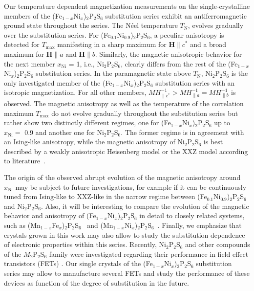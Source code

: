 \documentclass[twocolumn,superscriptaddress,prb,preprintnumbers,nobibnotes,aps]{revtex4-2}  %
\begin{document}
Our temperature dependent magnetization measurements on the single-crystalline members of the (Fe$_{1-x}$Ni$_x$)$_2$P$_2$S$_6$ substitution series exhibit an antiferromagnetic ground state throughout the series. The N\'{e}el temperature $T_\textrm{N}$, evolves gradually over the substitution series.  For (Fe$_{0.1}$Ni$_{0.9}$)$_2$P$_2$S$_6$, a peculiar anisotropy is detected for $T_\textrm{max}$ manifesting in a sharp maximum for $\boldsymbol{H} \parallel c^*$ and a broad maximum for $\boldsymbol{H} \parallel a$ and $\boldsymbol{H} \parallel b$. Similarly, the magnetic anisotropic behavior for the next member $x_\textrm{Ni}$ = 1, i.e., Ni$_2$P$_2$S$_6$, clearly differs from the rest of the (Fe$_{1-x}$Ni$_x$)$_2$P$_2$S$_6$ substitution series. In the paramagnetic state above $T_\textrm{N}$, Ni$_2$P$_2$S$_6$ is the only investigated member of the (Fe$_{1-x}$Ni$_x$)$_2$P$_2$S$_6$ substitution series with an isotropic magnetization. For all other members, $MH^{-1}_{\parallel c^*} > MH^{-1}_{\parallel a} = MH^{-1}_{\parallel b}$ is observed. The magnetic anisotropy as well as the temperature of the correlation maximum $T_\textrm{max}$ do not evolve gradually throughout the substitution series but rather show two distinctly different regimes, one for (Fe$_{1-x}$Ni$_x$)$_2$P$_2$S$_6$ up to $x_\textrm{Ni} =$ 0.9 and another one for Ni$_2$P$_2$S$_6$. The former regime is in agreement with an Ising-like anisotropy, while the magnetic anisotropy of Ni$_2$P$_2$S$_6$ is best described by a weakly anisotropic Heisenberg model or the XXZ model according to literature~\cite{PJoy1992,DLancon2016,Kim2019}.

The origin of the observed abrupt evolution of the magnetic anisotropy around $x_\textrm{Ni}$ may be subject to future investigations, for example if it can be continuously tuned from Ising-like to XXZ-like in the narrow regime between (Fe$_{0.1}$Ni$_{0.9}$)$_2$P$_2$S$_6$ and Ni$_2$P$_2$S$_6$. Also, it will be interesting to compare the evolution of the magnetic behavior and anisotropy of (Fe$_{1-x}$Ni$_x$)$_2$P$_2$S$_6$ in detail to closely related systems, such as (Mn$_{1-x}$Fe$_x$)$_2$P$_2$S$_6$~\cite{Masubuchi2008} and (Mn$_{1-x}$Ni$_x$)$_2$P$_2$S$_6$~\cite{Shemerliuk2021}. Finally, we emphasize that crystals grown in this work may also allow to study the substitution dependence of electronic properties within this series. Recently, Ni$_2$P$_2$S$_6$ and other compounds of the $M_2$P$_2$S$_6$ family were investigated regarding their performance in field effect transistors (FETs) \cite{Jenjeti2018,Kumar2019}. Our single crystals of the (Fe$_{1-x}$Ni$_x$)$_2$P$_2$S$_6$ substitution series may allow to manufacture several FETs and study the performance of these devices as function of the degree of substitution in the future.
\end{document}
